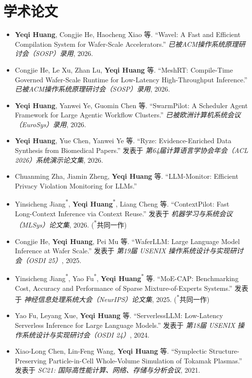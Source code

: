 \documentclass[a4paper,20pt]{article}
\newcommand{\resumeSubHeadingListStart}{\begin{itemize}[leftmargin=*]}
\newcommand{\resumeSubHeadingListEnd}{\end{itemize}}
\begin{document}
\section{学术论文}
\resumeSubHeadingListStart
\item [1] \textbf{Yeqi Huang}, Congjie He, Haocheng Xiao 等. ``Wavel: A Fast and Efficient Compilation System for Wafer-Scale Accelerators.'' \textit{已被ACM操作系统原理研讨会（SOSP）录用}, 2026.
\vspace{-5pt}
\item [2] Congjie He, Le Xu, Zhan Lu, \textbf{Yeqi Huang} 等. ``MeshRT: Compile-Time Governed Wafer-Scale Runtime for Low-Latency High-Throughput Inference.'' \textit{已被ACM操作系统原理研讨会（SOSP）录用}, 2026.
\vspace{-5pt}
\item [3] \textbf{Yeqi Huang}, Yanwei Ye, Guomin Chen 等. ``SwarmPilot: A Scheduler Agent Framework for Large Agentic Workflow Clusters.'' \textit{已被欧洲计算机系统会议（EuroSys）录用}, 2026.
\vspace{-5pt}
\item [4] \textbf{Yeqi Huang}, Yue Chen, Yanwei Ye 等. ``Ryze: Evidence-Enriched Data Synthesis from Biomedical Papers.'' 发表于 \textit{第64届计算语言学协会年会（ACL 2026）系统演示论文集}, 2026.
\vspace{-5pt}
\item [5] Chuanming Zha, Jiamin Zheng, \textbf{Yeqi Huang} 等. ``LLM-Monitor: Efficient Privacy Violation Monitoring for LLMs.''
\vspace{-5pt}
\item [6] Yinsicheng Jiang\textsuperscript{*}, \textbf{Yeqi Huang}\textsuperscript{*}, Liang Cheng 等. ``ContextPilot: Fast Long-Context Inference via Context Reuse.'' 发表于 \textit{机器学习与系统会议（MLSys）论文集}, 2026. (\textsuperscript{*}共同一作)
\vspace{-5pt}
\item [7] Congjie He, \textbf{Yeqi Huang}, Pei Mu 等. ``WaferLLM: Large Language Model Inference at Wafer Scale.'' 发表于 \textit{第19届 USENIX 操作系统设计与实现研讨会（OSDI 25）}, 2025.
\vspace{-5pt}
\item [8] Yinsicheng Jiang\textsuperscript{*}, Yao Fu\textsuperscript{*}, \textbf{Yeqi Huang}\textsuperscript{*} 等. ``MoE-CAP: Benchmarking Cost, Accuracy and Performance of Sparse Mixture-of-Experts Systems.'' 发表于 \textit{神经信息处理系统大会（NeurIPS）论文集}, 2025. (\textsuperscript{*}共同一作)
\vspace{-5pt}
\item [9] Yao Fu, Leyang Xue, \textbf{Yeqi Huang} 等. ``ServerlessLLM: Low-Latency Serverless Inference for Large Language Models.'' 发表于 \textit{第18届 USENIX 操作系统设计与实现研讨会（OSDI 24）}, 2024.
\vspace{-5pt}
\item [10] Xiao-Long Chen, Lin-Feng Wang, \textbf{Yeqi Huang} 等. ``Symplectic Structure-Preserving Particle-in-Cell Whole-Volume Simulation of Tokamak Plasmas.'' 发表于 \textit{SC21: 国际高性能计算、网络、存储与分析会议}, 2021.
\resumeSubHeadingListEnd
\end{document}
